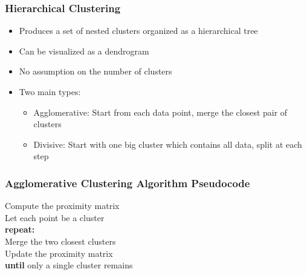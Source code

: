 \documentclass[aspectratio=169, 10pt]{beamer}
\begin{document}
\begin{frame}
    \frametitle{Hierarchical Clustering}
    
    \begin{itemize}
        \item Produces a set of nested clusters organized as a hierarchical tree
        \item Can be visualized as a dendrogram
        \item No assumption on the number of clusters
        \item Two main types:
            \begin{itemize}
                \item Agglomerative: Start from each data point, merge the closest pair of clusters
                \item Divisive: Start with one big cluster which contains all data, split at each step
            \end{itemize}
    \end{itemize}
    
\end{frame}

\begin{frame}
    \frametitle{Agglomerative Clustering Algorithm Pseudocode}
    
    \hrulefill \par

    \begin{tabbing}
        Compute the proximity matrix\\
        Let each point be a cluster\\
        \textbf{repeat:}\=\\
        \> Merge the two closest clusters\\
        \> Update the proximity matrix\\
        \textbf{until} only a single cluster remains
    \end{tabbing}

    \hrulefill \par
    
\end{frame}
\end{document}
